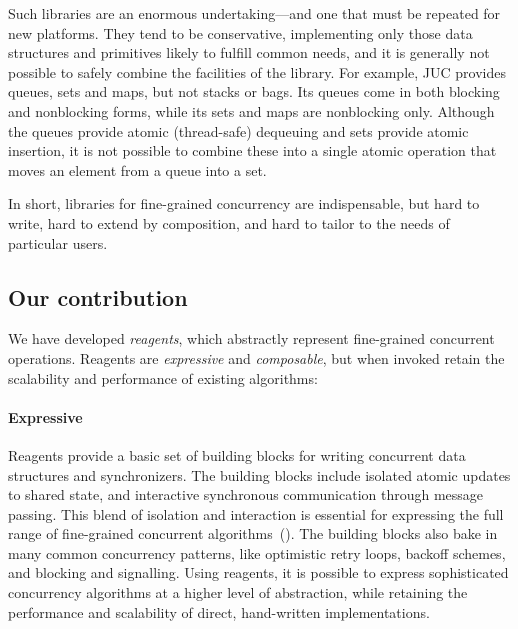 \documentclass[preprint,nocopyrightspace]{sigplanconf}
\begin{document}
Such libraries are an enormous undertaking---and one that must be repeated for
new platforms.  They tend to be conservative, implementing only those data
structures and primitives likely to fulfill common needs, and it is generally
not possible to safely combine the facilities of the library.  For example,
JUC provides queues, sets and maps, but not stacks or bags.  Its queues come
in both blocking and nonblocking forms, while its sets and maps are
nonblocking only.  Although the queues provide atomic (thread-safe) dequeuing
and sets provide atomic insertion, it is not possible to combine these into a
single atomic operation that moves an element from a queue into a set.

In short, libraries for fine-grained concurrency are indispensable, but hard
to write, hard to extend by composition, and hard to tailor to the needs of
particular users.

\subsection*{Our contribution}





We have developed \emph{reagents}, which abstractly represent fine-grained
concurrent operations.  Reagents are \emph{expressive} and \emph{composable},
but when invoked retain the scalability and performance of existing
algorithms:




\paragraph{Expressive}  
Reagents provide a basic set of building blocks for writing concurrent data
structures and synchronizers.  The building blocks include isolated atomic
updates to shared state, and interactive synchronous communication through
message passing.  This blend of isolation and interaction is essential for
expressing the full range of fine-grained concurrent
algorithms~().  The building blocks also bake in many common
concurrency patterns, like optimistic retry loops, backoff schemes, and blocking
and signalling.  Using reagents, it is possible to express sophisticated
concurrency algorithms at a higher level of abstraction, while retaining the
performance and scalability of direct, hand-written implementations.
\end{document}
